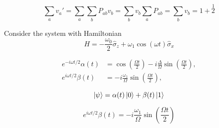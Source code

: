 

% 
% 
% 



\begin{equation*}
	\sum_a v_a' = \sum_a \sum_b P_{ab} v_b = \sum_b v_b \sum_a P_{ab} = \sum_b v_b = 1 + \overset{1}{2}
\end{equation*}

Consider the system with Hamiltonian
\begin{equation*}
	\hat{H} = - \frac{\omega_0}{2} \hat{\sigma}_z + \omega_1 \cos(\omega t) \hat{\sigma}_x
\end{equation*}


\begin{align*}
	e^{-i\omega t/2} \alpha(t) &= \cos\left(\frac{\Omega t}{2}\right) - i \frac{\Delta}{\Omega} \sin\left(\frac{\Omega t}{2}\right), \\
	e^{i\omega t/2} \beta(t) &= -i \frac{\omega_1}{\Omega} \sin\left(\frac{\Omega t}{2}\right),
\end{align*}

\begin{equation*}
	\left| \psi \right\rangle = \alpha(t) \left| 0 \right\rangle + \beta(t) \left| 1 \right\rangle
\end{equation*}

$$ e^{i\omega t/2} \beta (t) = -i \frac{\omega_1}{\Omega} \sin\left(\frac{\Omega t}{2}\right)$$